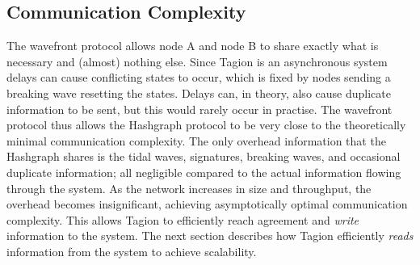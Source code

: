 \subsection{Communication Complexity}
    The \gls{wavefront protocol} allows node A and node B to share exactly what is necessary and (almost) nothing else. Since Tagion is an asynchronous system delays can cause conflicting states to occur, which is fixed by nodes sending a breaking wave resetting the states. Delays can, in theory, also cause duplicate information to be sent, but this would rarely occur in practise. The \gls{wavefront protocol} thus allows the Hashgraph protocol to be very close to the theoretically minimal communication complexity. The only overhead information that the Hashgraph shares is the tidal waves, signatures, breaking waves, and occasional duplicate information; all negligible compared to the actual information flowing through the system. As the network increases in size and throughput, the overhead becomes insignificant, achieving asymptotically optimal communication complexity. This allows Tagion to efficiently reach agreement and \textit{write} information to the system. The next section describes how Tagion efficiently \textit{reads} information from the system to achieve scalability.

\pagebreak